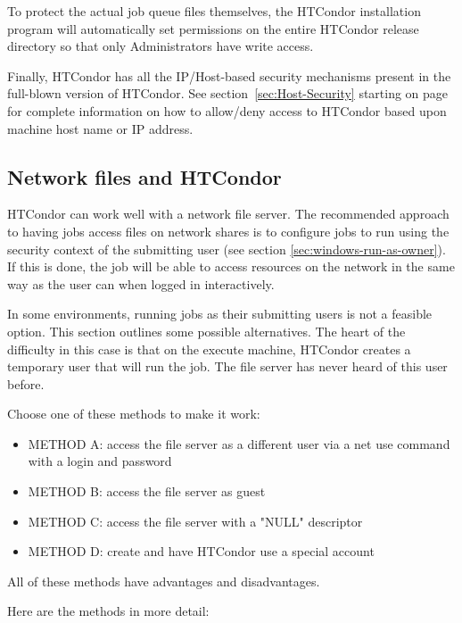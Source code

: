 To protect the actual job queue files themselves, the HTCondor installation
program will automatically set permissions on the entire HTCondor release
directory so that only Administrators have write access.

Finally, HTCondor has all the IP/Host-based security mechanisms present
in the full-blown version of HTCondor.  See section~\ref{sec:Host-Security}
starting on page~\pageref{sec:Host-Security} for complete information
on how to allow/deny access to HTCondor based upon machine host name or
IP address.


\subsection{\label{sec:network-files-solutions}Network files and HTCondor}

HTCondor can work well with a network file server.  The recommended
approach to having jobs access files on network shares is to configure
jobs to run using the security context of the submitting user (see
section \ref{sec:windows-run-as-owner}).  If this is done, the job
will be able to access resources on the network in the same way as the
user can when logged in interactively.

In some environments, running jobs as their submitting users is not a
feasible option.  This section outlines some possible
alternatives. The heart of the difficulty in this case is that on the
execute machine, HTCondor creates a temporary user that will run the
job.  The file server has never heard of this user before.

Choose one of these methods to make it work:

\begin{itemize}
\item METHOD A: access the file server as a different user via a net use command
with a login and password
\item METHOD B: access the file server as guest
\item METHOD C: access the file server with a "NULL" descriptor
\item METHOD D: create and have HTCondor use a special account 
\end{itemize}

All of these methods have advantages and disadvantages.

Here are the methods in more detail:

